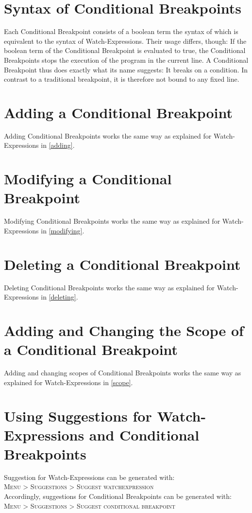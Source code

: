 \documentclass[parskip=full]{memoir}
\begin{document}
\section{Syntax of Conditional Breakpoints}
Each Conditional Breakpoint consists of a boolean term the syntax of which is equivalent to the syntax of Watch-Expressions. Their usage differs, though: If the boolean term of the Conditional Breakpoint is evaluated to true, the Conditional Breakpoints stops the execution of the program in the current line. A Conditional Breakpoint thus does exactly what its name suggests: It breaks on a condition. In contrast to a traditional breakpoint, it is therefore not bound to any fixed line.

\section{Adding a Conditional Breakpoint}
Adding Conditional Breakpoints works the same way as explained for Watch-Expressions in \ref{adding}.
\section{Modifying a Conditional Breakpoint}
Modifying Conditional Breakpoints works the same way as explained for Watch-Expressions in \ref{modifying}.
\section{Deleting a Conditional Breakpoint}
Deleting Conditional Breakpoints works the same way as explained for Watch-Expressions in \ref{deleting}.
\section{Adding and Changing the Scope of a Conditional Breakpoint}
Adding and changing scopes of Conditional Breakpoints works the same way as explained for Watch-Expressions in \ref{scope}.

\section{Using Suggestions for Watch-Expressions and Conditional Breakpoints}
Suggestion for Watch-Expressions can be generated with:\\
\textsc{Menu > Suggestions > Suggest watchexpression}\\

Accordingly, suggestions for Conditional Breakpoints can be generated with:\\
\textsc{Menu > Suggestions > Suggest conditional breakpoint}\\
\end{document}
